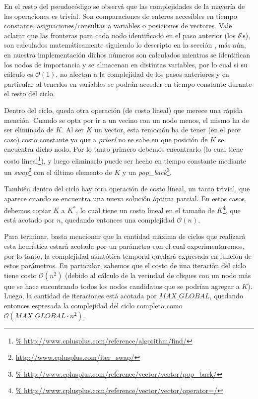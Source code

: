 \par En el resto del pseudoc\'odigo se observ\'a que las complejidades
    de la mayor\'ia de las operaciones es trivial. Son comparaciones de
    enteros accesibles en tiempo constante, asignaciones/consultas a variables
    o posiciones de vectores. Vale aclarar que las fronteras para
    cada nodo identificado en el paso anterior (los $\delta$'s), son
    calculados matem\'aticamente siguiendo lo descripto en la
    secci\'on \emph{}, m\'as a\'un, en nuestra implementaci\'on
    dichos n\'umeros son calculados mientras se identifican los nodos
    de importancia y se almacenan en distintas variables, por lo cual
    si su c\'alculo es $\mathcal O(1)$, no afectan a la complejidad de
    los pasos anteriores y en particular al tenerlos en variables se
    podr\'an acceder en tiempo constante durante el resto del ciclo.

\par Dentro del ciclo, queda otra operaci\'on (de costo lineal) que
    merece una r\'apida menci\'on. Cuando se opta por ir a un vecino
    con un nodo menos, el mismo ha de ser eliminado de $K$. Al ser
    $K$ un vector, esta remoci\'on ha de tener (en el peor caso) costo
    constante ya que a \emph{prior\'i} no se sabe en que posici\'on
    de $K$ se encuentra dicho nodo. Por lo tanto primero debemos encontrarlo
    (lo cual tiene costo lineal\footnote{\url{%
    http://www.cplusplus.com/reference/algorithm/find/}}), y luego eliminarlo
    puede ser hecho en tiempo constante mediante un \emph{swap}\footnote{%
    \url{http://www.cplusplus.com/iter_swap/}} con el \'ultimo elemento
    de $K$ y un \emph{pop\_back}\footnote{\url{%
    http://www.cplusplus.com/reference/vector/vector/pop_back/}}.

\par Tambi\'en dentro del ciclo hay otra operaci\'on de costo l\'ineal,
    un tanto trivial, que aparece cuando se encuentra una nueva soluci\'on
    \'optima parcial. En estos casos, debemos copiar $K$ a $K^*$, lo
    cual tiene un costo lineal en el tama\~no de $K$\footnote{\url{%
    http://www.cplusplus.com/reference/vector/vector/operator=/}},
    que est\'a acotado por $n$, quedando entonces una complejidad
    $\mathcal O(n)$.

\par Para terminar, basta mencionar que la cantidad m\'axima de ciclos
    que realizar\'a esta heur\'istica estar\'a acotada por un par\'ametro
    con el cual experimentaremos, por lo tanto, la complejidad asint\'otica
    temporal quedar\'a expresada en funci\'on de estos par\'ametros. En
    particular, sabemos que el costo de una iteraci\'on del ciclo tiene
    costo $\mathcal O(n^2)$ (debido al c\'alculo de la vecindad de 
    cliques con un nodo m\'as que se hace encontrando todos los nodos
    candidatos que se podr\'ian agregar a $K$). Luego, la cantidad de
    iteraciones est\'a acotada por $MAX\_GLOBAL$, quedando entonces
    espresada la complejidad del ciclo completo como $\mathcal O(%
    MAX\_GLOBAL \cdot n^2)$.

